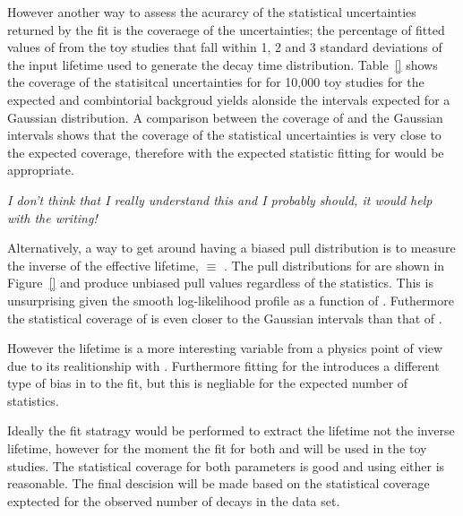 {However another way to assess the acurarcy of the statistical uncertainties returned by the \ml fit is the coveraege of the uncertainties; the percentage of fitted values of \tmumu from the toy studies that fall within 1, 2 and 3 standard deviations of the input lifetime used to generate the \bsmumu decay time distribution. Table~\ref{} shows the coverage of the statisitcal uncertainties for \tmumu for 10,000 toy studies for the expected \bsmumu and combintorial backgroud yields alonside the intervals expected for a Gaussian distribution. A comparison between the coverage of \tmumu and the Gaussian intervals shows that the coverage of the statistical uncertainties is very close to the expected coverage, therefore with the expected statistic fitting for \tmumu would be appropriate.

{\it I don't think that I really understand this and I probably should, it would help with the writing!}


Alternatively, a way to get around having a biased pull distribution is to measure the inverse of the effective lifetime, \invtmumu$ \equiv$ \Gmumu. The pull distributions for \Gmumu are shown in Figure~\ref{} and produce unbiased pull values regardless of the statistics. This is unsurprising given the smooth log-likelihood profile as a function of \Gmumu. Futhermore the statistical coverage of \Gmumu is even closer to the Gaussian intervals than that of \tmumu.

 However the lifetime is a more interesting variable from a physics point of view due to its realitionship with \ADG. Furthermore fitting for the \tGmumu introduces a different type of bias in to the fit, but this is negliable for the expected number of statistics. 



Ideally the fit statragy would be performed to extract the lifetime not the inverse lifetime, however for the moment the \ml fit for both \tmumu and \Gmumu will be used in the toy studies. The statistical coverage for both parameters is good and using either is reasonable. The final descision will be made based on the statistical coverage exptected for the observed number of decays in the data set. 


}
